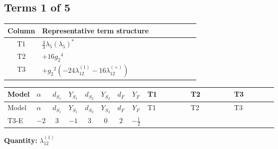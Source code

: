\documentclass[8pt]{article}
\begin{document}
\begin{landscape}
\subsection*{Terms 1 of 5}
\begin{center}
\begin{tabular}{@{}c >{\raggedright\arraybackslash}p{0.82\linewidth}@{}}
\toprule
Column & Representative term structure \\
\midrule
T1 & \(\displaystyle \frac{4}{3} {\lambda_5} \left({\lambda_5}\right)^{*}\) \\
\midrule
T2 & \(\displaystyle +16 {g_2}^4\) \\
\midrule
T3 & \(\displaystyle +{g_2}^2 (-24 {\lambda_{12}^{(1)}}-16 {\lambda_{12}^{(\times)}})\) \\
\midrule
\bottomrule
\end{tabular}
\end{center}
\smallskip
\tiny
\begin{longtable}{@{}llcccccc >{\raggedright\arraybackslash}p{0.21\linewidth} >{\raggedright\arraybackslash}p{0.21\linewidth} >{\raggedright\arraybackslash}p{0.21\linewidth}@{}}
\toprule
Model & $\alpha$ & $d_{S_1}$ & $Y_{S_1}$ & $d_{S_2}$ & $Y_{S_2}$ & $d_F$ & $Y_F$ & T1 & T2 & T3 \\
\midrule
\endfirsthead
\toprule
Model & $\alpha$ & $d_{S_1}$ & $Y_{S_1}$ & $d_{S_2}$ & $Y_{S_2}$ & $d_F$ & $Y_F$ & T1 & T2 & T3 \\
\midrule
\endhead
T3-E & $-2$ & $3$ & $-1$ & $3$ & $0$ & $2$ & $-\frac{1}{2}$ & \scriptsize\adjustbox{max width=\linewidth}{$\begin{gathered} \frac{4}{3} {\lambda_5} \left({\lambda_5}\right)^{*}\end{gathered}$} & \scriptsize\adjustbox{max width=\linewidth}{$\begin{gathered} +16 {g_2}^4\end{gathered}$} & \scriptsize\adjustbox{max width=\linewidth}{$\begin{gathered} +{g_2}^2 (-24 {\lambda_{12}^{(1)}}-16 {\lambda_{12}^{(\times)}})\end{gathered}$} \\
\midrule
\bottomrule
\end{longtable}
\clearpage
\noindent\textbf{Quantity: }$\lambda_{12}^{(1)}$\par\smallskip

\end{landscape}
\end{document}
